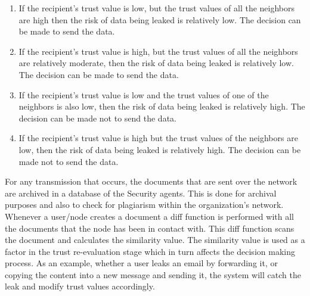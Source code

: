 \begin{enumerate}
    \item If the recipient's trust value is low, but the trust values of all the
        neighbors are high then the risk of data being leaked is relatively low. The
        decision can be made to send the data.
    \item If the recipient's trust value is high, but the trust values of all the
        neighbors are relatively moderate, then the risk of data being leaked is
        relatively low. The decision can be made to send the data.
    \item If the recipient's trust value is low and the trust values of one of the
        neighbors is also low, then the risk of data being leaked is relatively
        high. The decision can be made not to send the data.
    \item If the recipient's trust value is high but the trust values of the neighbors
are low, then the risk of data being leaked is relatively high. The decision
can be made not to send the data.  
\end{enumerate}
For any transmission that occurs, the
documents that are sent over the network are archived in a database of the
Security agents. This is done for archival purposes and also to check for
plagiarism within the organization's network. Whenever a user/node creates
a document a diff function is performed with all the documents that the node
has been in contact with. This diff function scans the document and
calculates the similarity value. The similarity value is used as a factor in
the trust re-evaluation stage which in turn affects the decision making
process. As an example, whether a user leaks an email by forwarding it, or
copying the content into a new message and sending it, the system will catch
the leak and modify trust values accordingly.

